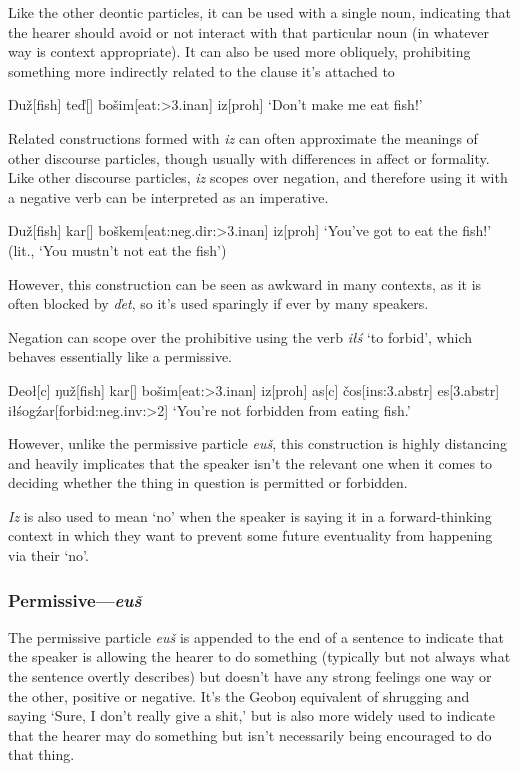 \documentclass[a4paper,11pt,oneside,openany]{memoir}
\newcommand{\vd}{ď}
\newcommand{\vc}{č}
\newcommand{\vz}{ž}
\newcommand{\vs}{š}
\newcommand{\Engma}{Ŋ}
\newcommand{\engma}{ŋ}
\begin{document}
Like the other deontic particles, it can be used with a single noun, indicating that the hearer should avoid or not interact with that particular noun (in whatever way is context appropriate). It can also be used more obliquely, prohibiting something more indirectly related to the clause it's attached to

\ex
\begingl
\Engma u\vz[fish]
te\vd[]
bo\vs im[eat:{\sc >3.inan}]
iz[\sc proh]
\glft `Don't make me eat fish!'
\endgl
\xe

Related constructions formed with \textit{iz} can often approximate the meanings of other discourse particles, though usually with differences in affect or formality. Like other discourse particles, \textit{iz} scopes over negation, and therefore using it with a negative verb can be interpreted as an imperative. 

\ex 
\begingl
\Engma u\vz[fish]
kar[]
bo\vs kem[eat:{\sc neg.dir:>3.inan}]
iz[\sc proh]
\glft `You've got to eat the fish!' (lit., `You mustn't not eat the fish')
\endgl
\xe

However, this construction can be seen as awkward in many contexts, as it is often blocked by \textit{\vd et}, so it's used sparingly if ever by many speakers.

Negation can scope over the prohibitive using the verb \textit{i\l\'s} `to forbid', which behaves essentially like a permissive.

\ex 
\begingl
Deo\l[\sc c]
\engma u\vz[fish]
kar[]
bo\vs im[eat:{\sc >3.inan}]
iz[\sc proh]
\nogloss{,}
as[\sc c]
\vc os[\sc ins:3.abstr]
es[\sc 3.abstr]
i\l\'sog\'zar[forbid:{\sc neg.inv:>2}]
\glft `You're not forbidden from eating fish.'
\endgl
\xe

However, unlike the permissive particle \textit{eu\vs}, this construction is highly distancing and heavily implicates that the speaker isn't the relevant one when it comes to deciding whether the thing in question is permitted or forbidden.

\textit{Iz} is also used to mean `no' when the speaker is saying it in a forward-thinking context in which they want to prevent some future eventuality from happening via their `no'.

\subsubsection{Permissive---\textit{eu\vs}} 

The permissive particle \textit{eu\vs} is appended to the end of a sentence to indicate that the speaker is allowing the hearer to do something (typically but not always what the sentence overtly describes) but doesn't have any strong feelings one way or the other, positive or negative. It's the Geobo{\engma} equivalent of shrugging and saying `Sure, I don't really give a shit,' but is also more widely used to indicate that the hearer may do something but isn't necessarily being encouraged to do that thing.
\end{document}
